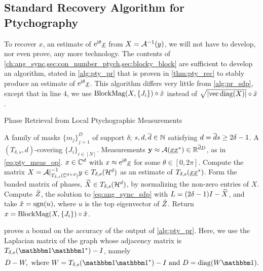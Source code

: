 \subsection{Standard Recovery Algorithm for Ptychography}
\label{sec:pty_std_rec}
To recover $x$, an estimate of $\mathrm{e}^{\mathrm{i} \theta} \underline{x}$ from $X = \mathcal{A}^{-1}(y)$, we will not have to develop, nor even prove, any more technology.  The contents of \cref{ch:ang_sync,sec:con_number_ptych,sec:blocky_block} are sufficient to develop an algorithm, stated in \cref{alg:pty_pr} that is proven in \cref{thm:pty_rec} to stably produce an estimate of $\mathrm{e}^{\mathrm{i} \theta} \underline{x}$.  This algorithm differs very little from \cref{alg:pr_sdp}, except that in line 4, we use $\operatorname{BlockMag}(X, \{J_i\}) \circ \tilde{x}$ instead of $\sqrt{\lvert\operatorname{vec} \operatorname{diag}(X)\rvert} \circ \tilde{x}$.

\begin{algorithm}
\renewcommand{\algorithmicrequire}{\textbf{Input:}}
\renewcommand{\algorithmicensure}{\textbf{Output:}}
\caption{Phase Retrieval from Local Ptychographic Measurements}
\label{alg:pty_pr}
\begin{algorithmic}[1]
    \REQUIRE A family of masks $\{m_j\}_{j = 1}^D$ of support $\delta$; $s, d, \overline{d} \in \mathbb{N}$ satisfying $d = \overline{d} s \ge 2 \delta - 1$.  A $(T_{\delta, s}, d)$-covering $\{J_i\}_{i \in [N]}$.  Measurements $\mathbf{y} \approx \mathcal{A}(\underline{x} \underline{x}^*) \in \mathbb{R}^{\overline{d} D}$, as in \eqref{eq:pty_meas_op}.
    \ENSURE $x \in \mathbb{C}^d$ with $x \approx \mathrm{e}^{\mathrm{i} \theta} \underline{x}$ for some $\theta \in [0, 2 \pi]$.
    \STATE Compute the matrix $X = \mathcal{A}|_{T_{\delta, s}(\mathbb{C}^{d \times d})}^{-1} y \in T_{\delta, s}(\mathcal{H}^d)$ as an estimate of $T_{\delta, s}(\underline{x} \underline{x}^*)$.
    \STATE Form the banded matrix of phases, $\widetilde{X} \in T_{\delta, s}(\mathcal{H}^d)$, by normalizing the non-zero entries of $X$. %
    \STATE Compute $\hat{Z}$, the solution to \eqref{eq:ang_sync_sdp} with $L = (2 \delta - 1) I - \widetilde{X}$, and take $\tilde{x} = \operatorname{sgn}(u),$ where $u$ is the top eigenvector of $\hat{Z}$.
    \STATE Return $x = \operatorname{BlockMag}(X, \{J_i\}) \circ \tilde{x}$.
\end{algorithmic}
\end{algorithm}

 proves a bound on the accuracy of the output of \cref{alg:pty_pr}.  Here, we use the Laplacian matrix of the graph whose adjacency matrix is $T_{\delta, s}(\one \one^*) - I$, namely \begin{equation}D - W, \ \text{where} \ W = T_{\delta, s}(\one \one^*) - I \ \text{and} \ D = \diag(W \one).\label{eq:pty_lap}\end{equation}

